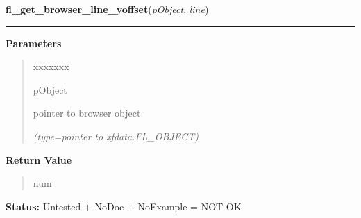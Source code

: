 \hspace{.8\funcindent}\begin{boxedminipage}{\funcwidth}

    \raggedright \textbf{fl\_get\_browser\_line\_yoffset}(\textit{pObject}, \textit{line})

    \vspace{-1.5ex}

    \rule{\textwidth}{0.5\fboxrule}
\setlength{\parskip}{2ex}
\setlength{\parskip}{1ex}
      \textbf{Parameters}
      \vspace{-1ex}

      \begin{quote}
        \begin{Ventry}{xxxxxxx}

          \item[pObject]

          pointer to browser object

            {\it (type=pointer to xfdata.FL\_OBJECT)}

        \end{Ventry}

      \end{quote}

      \textbf{Return Value}
    \vspace{-1ex}

      \begin{quote}
      num

      \end{quote}

\textbf{Status:} Untested + NoDoc + NoExample = NOT OK



    \end{boxedminipage}

    \label{xformslib:library:fl_get_browser_hscroll_callback}

    \vspace{0.5ex}


